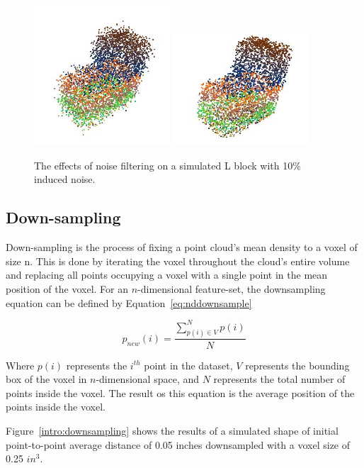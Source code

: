 \documentclass[12pt]{drexelthesis}
\let\Oldsubsection\subsection
\renewcommand{\subsection}{\FloatBarrier\Oldsubsection}
\begin{document}
\begin{figure}[!ht]
	\centering
		\includegraphics[width=2in]{l_block_pt_cloud10pnoise.jpg} \includegraphics[width=2in]{l_block_pt_cloud10pnoiseFILTEREDk100std05.jpg}
	\caption[Effects of noise filter on simulated point cloud objects]{\centering The effects of noise filtering on a simulated L block with 10\% induced noise.}
\end{figure}


\subsection{Down-sampling}
Down-sampling is the process of fixing a point cloud’s mean density to a voxel of size n. This is done by iterating the voxel throughout the cloud’s entire volume and replacing all points occupying a voxel with a single point in the mean position of the voxel. For an $n$-dimensional feature-set, the downsampling equation can be defined by Equation~\ref{eq:nddownsample}

\begin{equation}
	\label{eq:nddownsample}
	p_{new} (i) = \frac {\sum_{p(i) \in V}^{N} p(i) }  {N}
\end{equation}

Where $p(i)$ represents the $i^{th}$ point in the dataset, $V$ represents the bounding box of the voxel in $n$-dimensional space, and $N$ represents the total number of points inside the voxel. The result os this equation is the average position of the points inside the voxel.

Figure~\ref{intro:downsampling} shows the results of a simulated shape of initial point-to-point average distance of 0.05 inches downsampled with a voxel size of 0.25 $in^{3}$.
\end{document}

